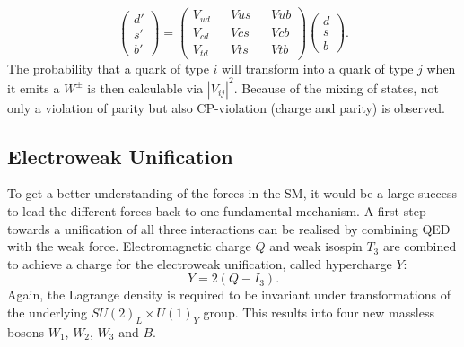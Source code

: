 	\begin{equation}
	\begin{pmatrix}d'\\s'\\b'\end{pmatrix} = 
	\begin{pmatrix}
	V_{ud}&&V{us}&&V{ub} \\
	V_{cd}&&V{cs}&&V{cb} \\
	V_{td}&&V{ts}&&V{tb}
	\end{pmatrix}
	\begin{pmatrix}d\\s\\b\end{pmatrix}.
	\end{equation}
	The probability that a quark of type $i$ will transform into a quark of type $j$ when it emits a $W^\pm$ is then calculable via $|V_{ij}|^2$. Because of the mixing of states, not only a violation of parity but also CP-violation (charge and parity) is observed.
	\subsection{Electroweak Unification}
	\label{sec:elw}	
	To get a better understanding of the forces in the SM, it would be a large success to lead the different forces back to one fundamental mechanism. A first step towards a unification of all three interactions can be realised by combining QED with the weak force. Electromagnetic charge $Q$ and weak isospin $T_3$ are combined to achieve a charge for the electroweak unification, called hypercharge $Y$:
	\begin{equation}
	Y = 2(Q-I_3).
	\end{equation}
	Again, the Lagrange density is required to be invariant under transformations of the underlying $SU(2)_L \times U(1)_Y$ group. This results into four new massless bosons $W_1$, $W_2$, $W_3$ and $B$. 
